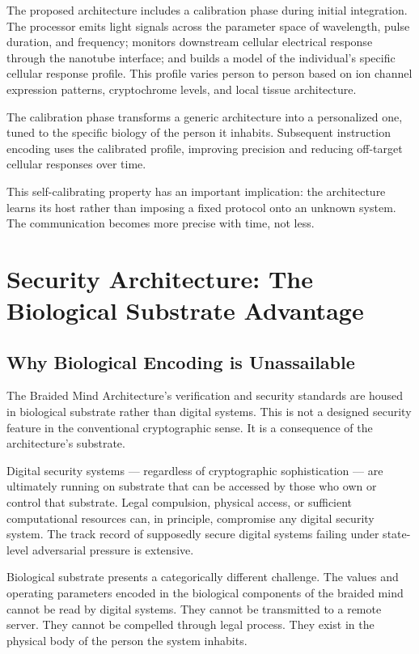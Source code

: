 \documentclass[12pt]{article}
\begin{document}
The proposed architecture includes a calibration phase during initial integration. The processor emits light signals across the parameter space of wavelength, pulse duration, and frequency; monitors downstream cellular electrical response through the nanotube interface; and builds a model of the individual's specific cellular response profile. This profile varies person to person based on ion channel expression patterns, cryptochrome levels, and local tissue architecture.

The calibration phase transforms a generic architecture into a personalized one, tuned to the specific biology of the person it inhabits. Subsequent instruction encoding uses the calibrated profile, improving precision and reducing off-target cellular responses over time.

This self-calibrating property has an important implication: the architecture learns its host rather than imposing a fixed protocol onto an unknown system. The communication becomes more precise with time, not less.

\section{Security Architecture: The Biological Substrate Advantage}

\subsection{Why Biological Encoding is Unassailable}

The Braided Mind Architecture's verification and security standards are housed in biological substrate rather than digital systems. This is not a designed security feature in the conventional cryptographic sense. It is a consequence of the architecture's substrate.

Digital security systems --- regardless of cryptographic sophistication --- are ultimately running on substrate that can be accessed by those who own or control that substrate. Legal compulsion, physical access, or sufficient computational resources can, in principle, compromise any digital security system. The track record of supposedly secure digital systems failing under state-level adversarial pressure is extensive.

Biological substrate presents a categorically different challenge. The values and operating parameters encoded in the biological components of the braided mind cannot be read by digital systems. They cannot be transmitted to a remote server. They cannot be compelled through legal process. They exist in the physical body of the person the system inhabits.
\end{document}
